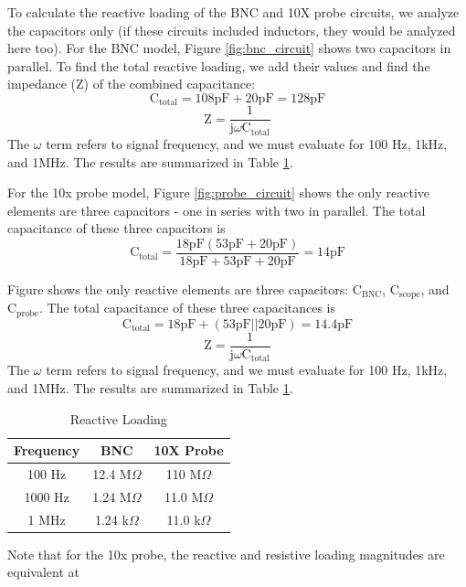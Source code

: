 \documentclass[12pt,letterpaper]{report}
\begin{document}
To calculate the reactive loading of the BNC and 10X probe circuits, we analyze the capacitors only (if these circuits included inductors, they would be analyzed here too). For the BNC model, Figure \ref{fig:bnc_circuit} shows two capacitors in parallel. To find the total reactive loading, we add their values and find the impedance (Z) of the combined capacitance:
$$ \text{C}_{\text{total}} = 108 \text{pF} + 20 \text{pF} = 128 \text{pF} $$
$$ \text{Z} = \frac{1}{\text{j}\omega\text{C}_{\text{total}}} $$
The $\omega$ term refers to signal frequency, and we must evaluate for 100 Hz, 1kHz, and 1MHz. The results are summarized in Table \ref{table:ReactiveLoading}.

For the 10x probe model, Figure \ref{fig:probe_circuit} shows the only reactive elements are three capacitors - one in series with two in parallel. The total capacitance of these three capacitors is
$$ \text{C}_{\text{total}} = \frac{18 \text{pF} (53 \text{pF} + 20 \text{pF})}{18 \text{pF} + 53 \text{pF} + 20 \text{pF}} = 14 \text{pF} $$

Figure 
 shows the only reactive elements are three capacitors: $\text{C}_{\text{BNC}}$, $\text{C}_{\text{scope}}$, and $\text{C}_{\text{probe}}$.
The total capacitance of these three capacitances is
$$ \text{C}_{\text{total}} = 18\text{pF} + (53 \text{pF} || 20\text{pF}) = 14.4 \text{pF}$$
$$ \text{Z} = \frac{1}{\text{j}\omega\text{C}_{\text{total}}} $$
The $\omega$ term refers to signal frequency, and we must evaluate for 100 Hz, 1kHz, and 1MHz. The results are summarized in Table \ref{table:ReactiveLoading}.
 
\begin{center}
\begin{table}[ht]
\caption{Reactive Loading}
\centering
	\begin{tabular}{| c | c | c |}
	\hline	
	Frequency & BNC & 10X Probe \\
	\hline
	100 Hz & 12.4 M$\Omega$ & 110 M$\Omega$\\
	1000 Hz & 1.24 M$\Omega$ & 11.0 M$\Omega$\\
	1 MHz & 1.24 k$\Omega$ & 11.0 k$\Omega$\\	
	\hline
	\end{tabular}
	\label{table:ReactiveLoading}
\end{table}
\end{center}

Note that for the 10x probe, the reactive and resistive loading magnitudes are equivalent at
\end{document}
